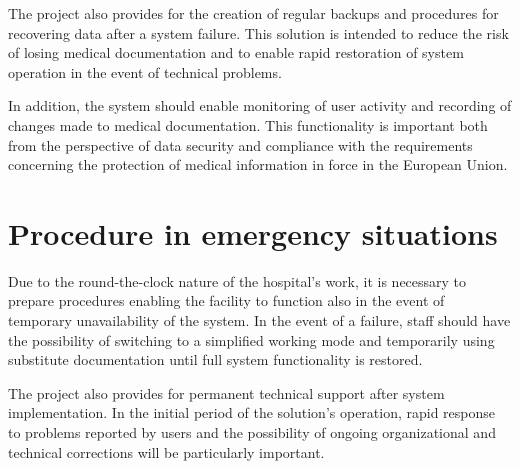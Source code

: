 The project also provides for the creation of regular backups and procedures for recovering data after a system failure. This solution is intended to reduce the risk of losing medical documentation and to enable rapid restoration of system operation in the event of technical problems.

In addition, the system should enable monitoring of user activity and recording of changes made to medical documentation. This functionality is important both from the perspective of data security and compliance with the requirements concerning the protection of medical information in force in the European Union.

\section{Procedure in emergency situations}

Due to the round-the-clock nature of the hospital's work, it is necessary to prepare procedures enabling the facility to function also in the event of temporary unavailability of the system. In the event of a failure, staff should have the possibility of switching to a simplified working mode and temporarily using substitute documentation until full system functionality is restored.

The project also provides for permanent technical support after system implementation. In the initial period of the solution's operation, rapid response to problems reported by users and the possibility of ongoing organizational and technical corrections will be particularly important.
